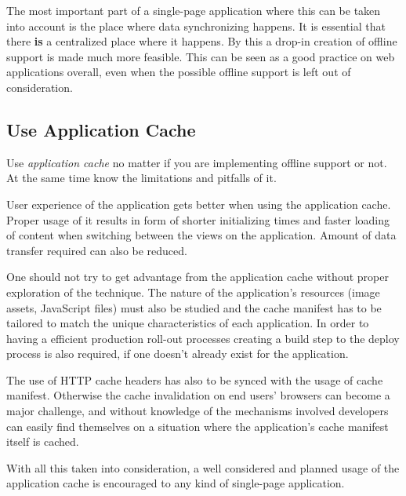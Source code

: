 The most important part of a single-page application where this can be taken into account is the place where data synchronizing happens. It is essential that there \textbf{is} a centralized place where it happens. By this a drop-in creation of offline support is made much more feasible. This can be seen as a good practice on web applications overall, even when the possible offline support is left out of consideration. 






\subsection{Use Application Cache}


Use \textit{application cache} no matter if you are implementing offline support or not. At the same time know the limitations and pitfalls of it.

User experience of the application gets better when using the application cache. Proper usage of it results in form of shorter initializing times and faster loading of content when switching between the views on the application. Amount of data transfer required can also be reduced. 

One should not try to get advantage from the application cache without proper exploration of the technique. The nature of the application's resources (image assets, JavaScript files) must also be studied and the cache manifest has to be tailored to match the unique characteristics of each application. In order to having a efficient production roll-out processes creating a build step to the deploy process is also required, if one doesn't already exist for the application.

The use of HTTP cache headers has also to be synced with the usage of cache manifest. Otherwise the cache invalidation on end users' browsers can become a major challenge, and without knowledge of the mechanisms involved developers can easily find themselves on a situation where the application's cache manifest itself is cached. 

With all this taken into consideration, a well considered and planned usage of the application cache is encouraged to any kind of single-page application.








